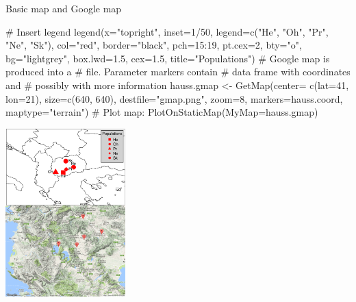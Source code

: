 \documentclass[compress, ucs, xelatex, 11pt, xcolor=svgnames,
  hyperref={
    bookmarks=true,
    unicode=true,
    colorlinks=true,
    pdftitle={Molecular data in R},
    plainpages=false,
    pdfauthor={Vojtech Zeisek},
    pdfsubject={Course about phylogeny and evolution in R},
    pdfcreator={XeLaTeX},
    pdfkeywords={R, evolution, phylogeny, molecular data},
    linkcolor=Tomato,
    anchorcolor=SaddleBrown,
    citecolor=Goldenrod,
    filecolor=DarkMagenta,
    menucolor=Sienna,
    urlcolor=DarkTurquoise,
    pdftex},
  url={hyphens, lowtilde} %
  ]{beamer}
\begin{document}
\begin{frame}[fragile]{Basic map and Google map}
\begin{multicols}{2}
  \begin{spluscode}
    # Insert legend
    legend(x="topright", inset=1/50,
      legend=c("He", "Oh", "Pr", "Ne",
      "Sk"), col="red", border="black",
      pch=15:19, pt.cex=2, bty="o",
      bg="lightgrey", box.lwd=1.5,
      cex=1.5, title="Populations")
    # Google map is produced into a
    # file. Parameter markers contain
    # data frame with coordinates and
    # possibly with more information
    hauss.gmap <- GetMap(center=
      c(lat=41, lon=21), size=c(640,
      640), destfile="gmap.png",
      zoom=8, markers=hauss.coord,
      maptype="terrain") # Plot map:
    PlotOnStaticMap(MyMap=hauss.gmap)
  \end{spluscode}
  \begin{center}
    \includegraphics[height=6.5cm]{maps.png}
  \end{center}
\end{multicols}
\end{frame}
\end{document}

